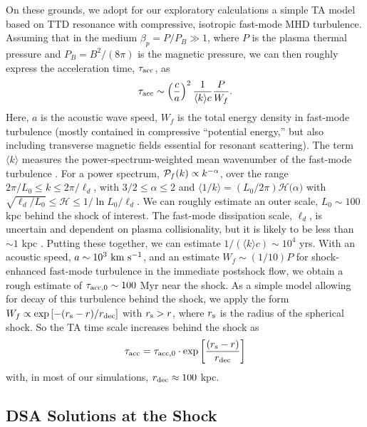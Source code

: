\documentclass[twocolumn]{aastex61}
\def\kms{~{\rm km~s^{-1}}}
\begin{document}
On these grounds, we adopt for our exploratory calculations a simple %
TA model based on TTD resonance with compressive, isotropic fast-mode MHD turbulence. Assuming that in the medium $\beta_p = P/P_B \gg 1$, where $P$ is the plasma thermal pressure and $P_B = B^2/(8\pi)$ is the magnetic pressure, we can then roughly express the acceleration time, $\tau_{\rm acc}$, as
\begin{equation}
\tau_{\rm acc} \sim \left(\frac{c}{a}\right)^2 \frac{1}{\langle k \rangle c} \frac{P}{W_f}.
\end{equation}
Here, $a$ is the acoustic wave speed, $W_f$ is the total energy density in fast-mode turbulence (mostly contained in compressive ``potential energy,'' but also including transverse magnetic fields essential for resonant scattering). The term $\langle k \rangle$ measures the power-spectrum-weighted mean wavenumber of the fast-mode turbulence \citep[e.g.,][]{brunetti2007}. For a power spectrum, ${\cal P}_f(k) \propto k^{-\alpha}$, over the range $2\pi/L_0\le k\le 2\pi/\ell_d$, with $3/2 \le\alpha\le 2$ \citep[e.g.,][]{brunetti2011} and $\langle 1/k \rangle =( L_0/2\pi )\mathcal{H(\alpha})$ with $\sqrt{\ell_d/L_0} \le \mathcal{H}\le 1/\ln{L_0/\ell_d}$. We can roughly estimate an outer scale, $L_0 \sim 100$ kpc behind
the shock of interest. The fast-mode dissipation scale, $\ell_d$, is uncertain and dependent on plasma collisionality, but it is likely to be less than $\sim 1$ kpc \citep[e.g.,][]{schek2006,brunetti2007,brunetti2011}. Putting these together, we can estimate $1/(\langle k\rangle c) \sim 10^4$ yrs. With an acoustic speed, $a \sim 10^3\kms $, and an estimate $W_f \sim (1/10) P$ for shock-enhanced fast-mode turbulence in the immediate postshock flow, we obtain a rough estimate of $\tau_{\rm acc,0} \sim 100$ Myr near the shock. 
As a simple model allowing for decay of this turbulence behind the shock, 
we apply the form $W_f \propto \exp\left[{{-(r_{\rm s}-r)} / r_{\rm dec}} \right]$ with $r_{\rm s}>r$,
where $r_{\rm s}$ is the radius of the spherical shock. 
So the TA time scale increases behind the shock as
\begin{equation}
\tau_{\rm acc} = \tau_{\rm acc,0} \cdot \exp\left[{{(r_{\rm s}-r)} \over r_{\rm dec}} \right]
\end{equation}
with, in most of our simulations, $r_{\rm dec}\approx 100$ kpc.

\subsection{DSA Solutions at the Shock}
\end{document}
